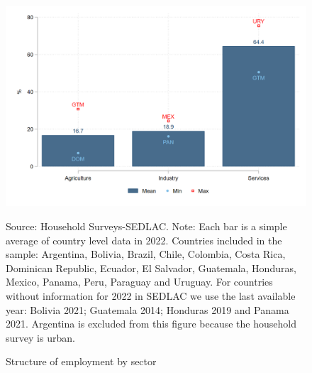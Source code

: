 \documentclass[english]{article}
\begin{document}
\begin{itemize}
            \begin{figure}[H]
                \justifying
                \caption{Structure of employment by sector}     
                \centerline{\includegraphics[scale=.3]{latex/figures/Snapshot/Structure of employment and sector.png}
                \label{fig:sector}}
               \footnotesize{Source: Household Surveys-SEDLAC.}
                \footnotesize{Note: Each bar is a simple average of country level data in 2022. Countries included in the sample: Argentina, Bolivia, Brazil, Chile, Colombia, Costa Rica, Dominican Republic, Ecuador, El Salvador, Guatemala, Honduras, Mexico, Panama, Peru, Paraguay and Uruguay. For countries without information for 2022 in SEDLAC we use the last available year: Bolivia 2021; Guatemala 2014; Honduras 2019 and Panama 2021. Argentina is excluded from this figure because the household survey is urban.}
            \end{figure}
    

\end{itemize}
\end{document}

